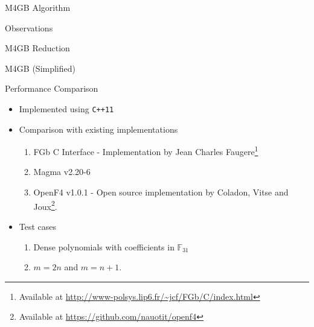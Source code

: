 \documentclass{beamer}
\newcommand{\Field}{\mathbb{F}}
\newcommand{\FField}[1]{\Field_{#1}}
\begin{document}
\begin{section}{M4GB Algorithm} %
  \begin{frame}{Observations}
  \end{frame}

  \begin{frame}{M4GB Reduction}
  \end{frame}

  \begin{frame}{M4GB (Simplified)}
  \end{frame}
\end{section}


\begin{section}{Performance Comparison}
  \begin{frame}
    \begin{itemize}
    \item<1-> Implemented using \texttt{C++11}
    \item<2-> Comparison with existing implementations
      \begin{enumerate}
      \item FGb C Interface - Implementation by Jean Charles
        Faugere\footnote<2->{Available at
          \url{http://www-polsys.lip6.fr/~jcf/FGb/C/index.html}}
      \item Magma v2.20-6
      \item OpenF4 v1.0.1 - Open source implementation by Coladon,
        Vitse and Joux\footnote<2->{Available at
          \url{https://github.com/nauotit/openf4}}.
      \end{enumerate}

    \item<3-> Test cases
      \begin{enumerate}
      \item Dense polynomials with coefficients in $\FField{31}$
      \item $m = 2n$ and $m = n + 1$.
      \end{enumerate}
      
     
    \end{itemize}
    
  \end{frame}


\end{section}
\end{document}
